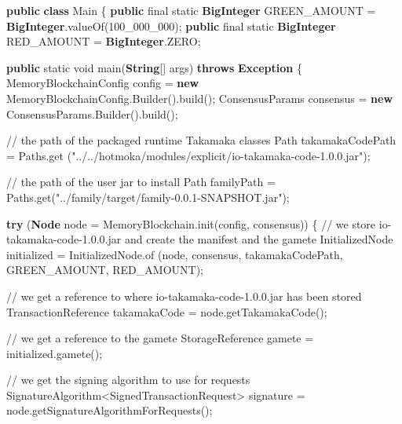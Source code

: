 \documentclass[a4paper,]{book}
\newenvironment{Shaded}{\begin{snugshade}}{\end{snugshade}}
\newcommand{\BuiltInTok}[1]{\textcolor[rgb]{0.39,0.29,0.61}{\textbf{#1}}}
\newcommand{\CommentTok}[1]{\textcolor[rgb]{0.54,0.53,0.53}{#1}}
\newcommand{\DataTypeTok}[1]{\textcolor[rgb]{0.00,0.34,0.68}{#1}}
\newcommand{\DecValTok}[1]{\textcolor[rgb]{0.69,0.50,0.00}{#1}}
\newcommand{\FunctionTok}[1]{\textcolor[rgb]{0.39,0.29,0.61}{#1}}
\newcommand{\KeywordTok}[1]{\textcolor[rgb]{0.12,0.11,0.11}{\textbf{#1}}}
\newcommand{\NormalTok}[1]{\textcolor[rgb]{0.12,0.11,0.11}{#1}}
\newcommand{\StringTok}[1]{\textcolor[rgb]{0.75,0.01,0.01}{#1}}
\renewenvironment{Shaded}{\begin{snugshade}\small}{\end{snugshade}}
\begin{document}
{\begin{Shaded}
\begin{Highlighting}[]
\KeywordTok{public} \KeywordTok{class}\NormalTok{ Main \{}
  \KeywordTok{public} \DataTypeTok{final} \DataTypeTok{static} \BuiltInTok{BigInteger}\NormalTok{ GREEN_AMOUNT = }\BuiltInTok{BigInteger}\NormalTok{.}\FunctionTok{valueOf}\NormalTok{(}\DecValTok{100_000_000}\NormalTok{);}
  \KeywordTok{public} \DataTypeTok{final} \DataTypeTok{static} \BuiltInTok{BigInteger}\NormalTok{ RED_AMOUNT = }\BuiltInTok{BigInteger}\NormalTok{.}\FunctionTok{ZERO}\NormalTok{;}

  \KeywordTok{public} \DataTypeTok{static} \DataTypeTok{void} \FunctionTok{main}\NormalTok{(}\BuiltInTok{String}\NormalTok{[] args) }\KeywordTok{throws} \BuiltInTok{Exception}\NormalTok{ \{}
\NormalTok{    MemoryBlockchainConfig config = }\KeywordTok{new}\NormalTok{ MemoryBlockchainConfig.}\FunctionTok{Builder}\NormalTok{().}\FunctionTok{build}\NormalTok{();}
\NormalTok{    ConsensusParams consensus = }\KeywordTok{new}\NormalTok{ ConsensusParams.}\FunctionTok{Builder}\NormalTok{().}\FunctionTok{build}\NormalTok{();}

    \CommentTok{// the path of the packaged runtime Takamaka classes}
\NormalTok{    Path takamakaCodePath = Paths.}\FunctionTok{get}
\NormalTok{      (}\StringTok{"../../hotmoka/modules/explicit/io-takamaka-code-1.0.0.jar"}\NormalTok{);}

    \CommentTok{// the path of the user jar to install}
\NormalTok{    Path familyPath = Paths.}\FunctionTok{get}\NormalTok{(}\StringTok{"../family/target/family-0.0.1-SNAPSHOT.jar"}\NormalTok{);}

    \KeywordTok{try}\NormalTok{ (}\BuiltInTok{Node}\NormalTok{ node = MemoryBlockchain.}\FunctionTok{init}\NormalTok{(config, consensus)) \{}
      \CommentTok{// we store io-takamaka-code-1.0.0.jar and create the manifest and the gamete}
\NormalTok{      InitializedNode initialized = InitializedNode.}\FunctionTok{of}
\NormalTok{        (node, consensus, takamakaCodePath, GREEN_AMOUNT, RED_AMOUNT);}

      \CommentTok{// we get a reference to where io-takamaka-code-1.0.0.jar has been stored}
\NormalTok{      TransactionReference takamakaCode = node.}\FunctionTok{getTakamakaCode}\NormalTok{();}

      \CommentTok{// we get a reference to the gamete}
\NormalTok{      StorageReference gamete = initialized.}\FunctionTok{gamete}\NormalTok{();}

      \CommentTok{// we get the signing algorithm to use for requests}
\NormalTok{      SignatureAlgorithm<SignedTransactionRequest> signature}
\NormalTok{        = node.}\FunctionTok{getSignatureAlgorithmForRequests}\NormalTok{();}


\end{Highlighting}
\end{Shaded}}
\end{document}
